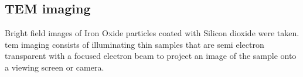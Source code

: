 \documentclass[12pt,a4paper]{article}
\begin{document}
\subsection{TEM imaging} %
\label{sub:tem_imaging}

Bright field images of Iron Oxide particles coated with Silicon dioxide were taken.  \ac{tem} imaging consists of illuminating thin samples that are semi electron transparent with a focused electron beam to project an image of the sample onto a viewing screen or camera.

\lipsum[6] %

\lipsum[6] %

\lipsum[6] %

\lipsum[6] %

\lipsum[6] %
\end{document}
